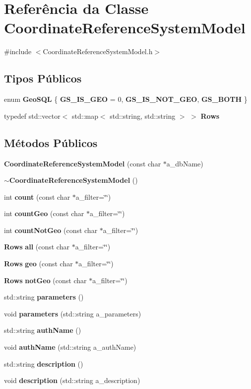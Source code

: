 \section{Referência da Classe Coordinate\+Reference\+System\+Model}
\label{class_coordinate_reference_system_model}


{\ttfamily \#include $<$Coordinate\+Reference\+System\+Model.\+h$>$}

\subsection*{Tipos Públicos}
\begin{DoxyCompactItemize}
\item 
enum {\bf Geo\+S\+QL} \{ {\bf G\+S\+\_\+\+I\+S\+\_\+\+G\+EO} = 0, 
{\bf G\+S\+\_\+\+I\+S\+\_\+\+N\+O\+T\+\_\+\+G\+EO}, 
{\bf G\+S\+\_\+\+B\+O\+TH}
 \}
\item 
typedef std\+::vector$<$ std\+::map$<$ std\+::string, std\+::string $>$ $>$ {\bf Rows}
\end{DoxyCompactItemize}
\subsection*{Métodos Públicos}
\begin{DoxyCompactItemize}
\item 
{\bf Coordinate\+Reference\+System\+Model} (const char $\ast$a\+\_\+db\+Name)
\item 
{\bf $\sim$\+Coordinate\+Reference\+System\+Model} ()
\item 
int {\bf count} (const char $\ast$a\+\_\+filter=\char`\"{}\char`\"{})
\item 
int {\bf count\+Geo} (const char $\ast$a\+\_\+filter=\char`\"{}\char`\"{})
\item 
int {\bf count\+Not\+Geo} (const char $\ast$a\+\_\+filter=\char`\"{}\char`\"{})
\item 
{\bf Rows} {\bf all} (const char $\ast$a\+\_\+filter=\char`\"{}\char`\"{})
\item 
{\bf Rows} {\bf geo} (const char $\ast$a\+\_\+filter=\char`\"{}\char`\"{})
\item 
{\bf Rows} {\bf not\+Geo} (const char $\ast$a\+\_\+filter=\char`\"{}\char`\"{})
\item 
std\+::string {\bf parameters} ()
\item 
void {\bf parameters} (std\+::string a\+\_\+parameters)
\item 
std\+::string {\bf auth\+Name} ()
\item 
void {\bf auth\+Name} (std\+::string a\+\_\+auth\+Name)
\item 
std\+::string {\bf description} ()
\item 
void {\bf description} (std\+::string a\+\_\+description)
\end{DoxyCompactItemize}
